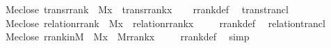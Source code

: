 \begin{isabellebody}
%
\endisatagproof
{\isafoldproof}%
%
\isadelimproof
\isanewline
%
\endisadelimproof
\isanewline
{}\isamarkupfalse%
\ {\isacharparenleft}{\kern0pt}\ M{\isacharunderscore}{\kern0pt}eclose{\isacharparenright}{\kern0pt}\ trans{\isacharunderscore}{\kern0pt}rrank\ {\isacharcolon}{\kern0pt}\ {\isachardoublequoteopen}M{\isacharparenleft}{\kern0pt}x{\isacharparenright}{\kern0pt}\ {\isasymLongrightarrow}\ trans{\isacharparenleft}{\kern0pt}rrank{\isacharparenleft}{\kern0pt}x{\isacharparenright}{\kern0pt}{\isacharparenright}{\kern0pt}{\isachardoublequoteclose}\isanewline
%
\isadelimproof
\ \ %
\endisadelimproof
%
\isatagproof
{}\isamarkupfalse%
\ rrank{\isacharunderscore}{\kern0pt}def\ \isamarkupfalse%
\ trans{\isacharunderscore}{\kern0pt}trancl\ \isacommand{{\isachardot}{\kern0pt}}\isamarkupfalse%
%
\endisatagproof
{\isafoldproof}%
%
\isadelimproof
\isanewline
%
\endisadelimproof
\isanewline
{}\isamarkupfalse%
\ {\isacharparenleft}{\kern0pt}\ M{\isacharunderscore}{\kern0pt}eclose{\isacharparenright}{\kern0pt}\ relation{\isacharunderscore}{\kern0pt}rrank\ {\isacharcolon}{\kern0pt}\ {\isachardoublequoteopen}M{\isacharparenleft}{\kern0pt}x{\isacharparenright}{\kern0pt}\ {\isasymLongrightarrow}\ relation{\isacharparenleft}{\kern0pt}rrank{\isacharparenleft}{\kern0pt}x{\isacharparenright}{\kern0pt}{\isacharparenright}{\kern0pt}{\isachardoublequoteclose}\ \isanewline
%
\isadelimproof
\ \ %
\endisadelimproof
%
\isatagproof
{}\isamarkupfalse%
\ rrank{\isacharunderscore}{\kern0pt}def\ \isamarkupfalse%
\ relation{\isacharunderscore}{\kern0pt}trancl\ \isacommand{{\isachardot}{\kern0pt}}\isamarkupfalse%
%
\endisatagproof
{\isafoldproof}%
%
\isadelimproof
\isanewline
%
\endisadelimproof
\isanewline
{}\isamarkupfalse%
\ {\isacharparenleft}{\kern0pt}\ M{\isacharunderscore}{\kern0pt}eclose{\isacharparenright}{\kern0pt}\ rrank{\isacharunderscore}{\kern0pt}in{\isacharunderscore}{\kern0pt}M\ {\isacharcolon}{\kern0pt}\ {\isachardoublequoteopen}M{\isacharparenleft}{\kern0pt}x{\isacharparenright}{\kern0pt}\ {\isasymLongrightarrow}\ M{\isacharparenleft}{\kern0pt}rrank{\isacharparenleft}{\kern0pt}x{\isacharparenright}{\kern0pt}{\isacharparenright}{\kern0pt}{\isachardoublequoteclose}\ \isanewline
%
\isadelimproof
\ \ %
\endisadelimproof
%
\isatagproof
{}\isamarkupfalse%
\ rrank{\isacharunderscore}{\kern0pt}def\ \isamarkupfalse%
\ simp%
\endisatagproof
{\isafoldproof}%
%
\isadelimproof
%
\endisadelimproof

\end{isabellebody}
